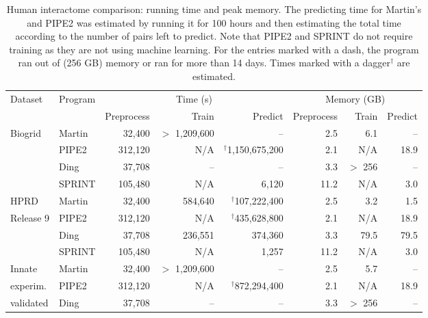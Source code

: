 \begin{table}[!h!] 
\centering
\caption[Human interactome comparison]{Human interactome comparison: running time and peak memory. The predicting time for Martin's and PIPE2 was estimated by running it for 100 hours and then estimating the total time according to the number of pairs left to predict. Note that PIPE2 and SPRINT do not require training as they are not using machine learning. For the entries marked with a dash, the program ran out of (256 GB) memory or ran for more than 14 days. Times marked with a dagger${}^\dag$ are estimated.\label{table_interactome_time}}
\begin{tabular}{@{}llrrrrrr@{}} \toprule
Dataset & Program & \multicolumn{3}{c}{Time (s)} &  \multicolumn{3}{|c}{Memory (GB)}   \\ \cmidrule{3-5} \cmidrule{6-8}
 &	& Preprocess & Train & Predict &  Preprocess & Train & Predict \\ \midrule
Biogrid & %
	Martin & 32,400 & $>$ 1,209,600  & {\scriptsize  -- } & 2.5 & 6.1 & {\scriptsize  -- } \\ 
&	PIPE2 & 312,120 & {\scriptsize N$\!$/$\!$A} & ${}^\dag$1,150,675,200 & 2.1 & {\scriptsize N$\!$/$\!$A} & 18.9\\ 
&	Ding	   & 37,708 & {\scriptsize  -- } & {\scriptsize  -- }  & 3.3 &  $>$ 256 & {\scriptsize  -- }\\
&	SPRINT & 105,480 & {\scriptsize N$\!$/$\!$A} & 6,120 & 11.2 & {\scriptsize N$\!$/$\!$A} & 3.0 \\ \midrule
HPRD  & %
	Martin & 32,400 & 584,640 & ${}^\dag$107,222,400  & 2.5 & 3.2 & 1.5 \\ 
Release 9 &	PIPE2 & 312,120 & {\scriptsize N$\!$/$\!$A} & ${}^\dag$435,628,800 &  2.1 & {\scriptsize N$\!$/$\!$A} & 18.9 \\ 
&	Ding	   & 37,708 & 236,551 & 374,360 & 3.3 & 79.5 & 79.5\\
&	SPRINT & 105,480 & {\scriptsize N$\!$/$\!$A} & 1,257 & 11.2 & {\scriptsize N$\!$/$\!$A} & 3.0 \\ \midrule
Innate   & %
	Martin & 32,400 & $>$ 1,209,600 & {\scriptsize  -- }  & 2.5 & 5.7 & {\scriptsize  -- } \\ 
experim. &	PIPE2 & 312,120 & {\scriptsize N$\!$/$\!$A} & ${}^\dag$872,294,400 &  2.1 &  {\scriptsize N$\!$/$\!$A} & 18.9 \\ 
validated &	Ding	   & 37,708 & {\scriptsize  -- } & {\scriptsize  -- }  & 3.3 &  $>$ 256 & {\scriptsize  -- } \\

\end{tabular}
\end{table}
